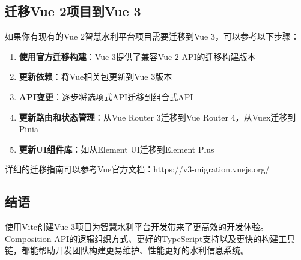 \subsection{迁移Vue 2项目到Vue
3}\label{ux8fc1ux79fbvue-2ux9879ux76eeux5230vue-3}

如果你有现有的Vue 2智慧水利平台项目需要迁移到Vue 3，可以参考以下步骤：

\begin{enumerate}
\def\labelenumi{\arabic{enumi}.}
\tightlist
\item
  \textbf{使用官方迁移构建}：Vue 3提供了兼容Vue 2 API的迁移构建版本
\item
  \textbf{更新依赖}：将Vue相关包更新到Vue 3版本
\item
  \textbf{API变更}：逐步将选项式API迁移到组合式API
\item
  \textbf{更新路由和状态管理}：从Vue Router 3迁移到Vue Router
  4，从Vuex迁移到Pinia
\item
  \textbf{更新UI组件库}：如从Element UI迁移到Element Plus
\end{enumerate}

详细的迁移指南可以参考Vue官方文档：https://v3-migration.vuejs.org/

\subsection{结语}\label{ux7ed3ux8bed}

使用Vite创建Vue
3项目为智慧水利平台开发带来了更高效的开发体验。Composition
API的逻辑组织方式、更好的TypeScript支持以及更快的构建工具链，都能帮助开发团队构建更易维护、性能更好的水利信息系统。
